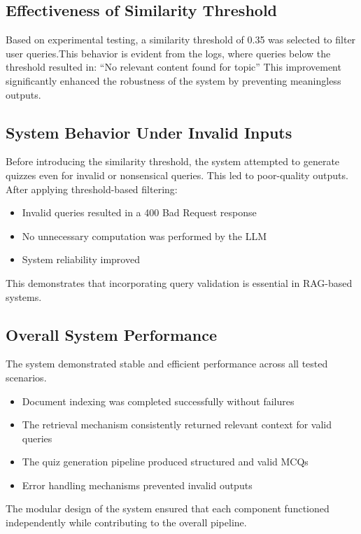\documentclass[12pt,a4paper]{report}
\begin{document}
\subsection{Effectiveness of Similarity Threshold}
Based on experimental testing, a similarity threshold of 0.35 was selected to filter user queries.This behavior is evident from the logs, where queries below the threshold resulted in:
“No relevant content found for topic”
This improvement significantly enhanced the robustness of the system by preventing meaningless outputs.
\subsection{System Behavior Under Invalid Inputs}
Before introducing the similarity threshold, the system attempted to generate quizzes even for invalid or nonsensical queries. This led to poor-quality outputs.
After applying threshold-based filtering:
\begin{itemize}
\item Invalid queries resulted in a 400 Bad Request response
\item No unnecessary computation was performed by the LLM
\item System reliability improved
\end{itemize}
This demonstrates that incorporating query validation is essential in RAG-based systems.
\subsection{Overall System Performance}
The system demonstrated stable and efficient performance across all tested scenarios.
\begin{itemize}
\item Document indexing was completed successfully without failures
\item The retrieval mechanism consistently returned relevant context for valid queries
\item The quiz generation pipeline produced structured and valid MCQs
\item Error handling mechanisms prevented invalid outputs
\end{itemize}
The modular design of the system ensured that each component functioned independently while contributing to the overall pipeline.
\end{document}
